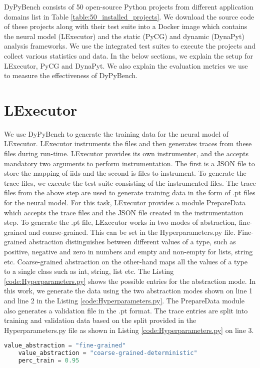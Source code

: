 DyPyBench consists of 50 open-source Python projects from different application domains list in Table \ref{table:50_installed_projects}.
We download the source code of these projects along with their test suite into a Docker image which contains the neural model (LExecutor) and the static (PyCG) and dynamic (DynaPyt) analysis frameworks.
We use the integrated test suites to execute the projects and collect various statistics and data.
In the below sections, we explain the setup for LExecutor, PyCG and DynaPyt.
We also explain the evaluation metrics we use to measure the effectiveness of DyPyBench.

\section{LExecutor}
We use DyPyBench to generate the training data for the neural model of LExecutor.
LExecutor instruments the files and then generates traces from these files during run-time.
LExecutor provides its own instrumenter, and the accepts mandatory two arguments to perform instrumentation.
The first is a JSON file to store the mapping of iids and the second is files to instrument.
To generate the trace files, we execute the test suite consisting of the instrumented files.
The trace files from the above step are used to generate training data in the form of .pt files for the neural model.
For this task, LExecutor provides a module PrepareData which accepts the trace files and the JSON file created in the instrumentation step.
To generate the .pt file, LExecutor works in two modes of abstraction, fine-grained and coarse-grained.
This can be set in the Hyperparameters.py file.
Fine-grained abstraction distinguishes between different values of a type, such as positive, negative and zero in numbers and empty and non-empty for lists, string etc.
Coarse-grained abstraction on the other-hand maps all the values of a type to a single class such as int, string, list etc. \cite{LExecutor_2023}
The Listing \ref{code:Hyperparameters.py} shows the possible entries for the abstraction mode.
In this work, we generate the data using the two abstraction modes shown on line 1 and line 2 in the Listing \ref{code:Hyperparameters.py}. 
The PrepareData module also generates a validation file in the .pt format.
The trace entries are split into training and validation data based on the split provided in the Hyperparameters.py file as shown in Listing \ref{code:Hyperparameters.py} on line 3.
\begin{lstlisting}[caption=Abstraction Modes in LExecutor,label=code:Hyperparameters.py,language=Python]
    value_abstraction = "fine-grained"
    value_abstraction = "coarse-grained-deterministic"
    perc_train = 0.95
\end{lstlisting}

